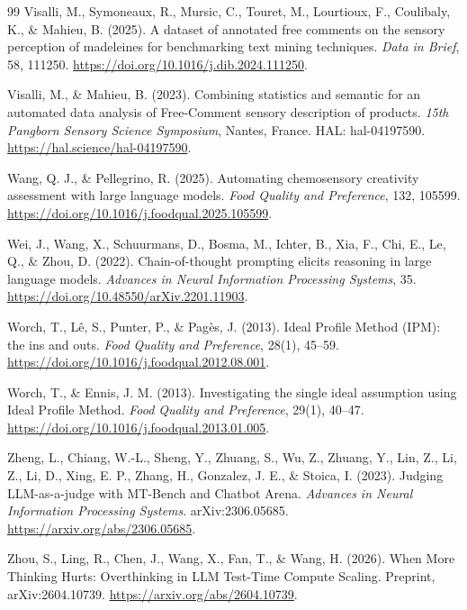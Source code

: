 \documentclass[12pt]{article}
\begin{document}
\begin{thebibliography}{99}
Visalli, M., Symoneaux, R., Mursic, C., Touret, M., Lourtioux, F., Coulibaly, K., \& Mahieu, B. (2025).
A dataset of annotated free comments on the sensory perception of madeleines for benchmarking text mining techniques.
\textit{Data in Brief}, 58, 111250.
\url{https://doi.org/10.1016/j.dib.2024.111250}.

Visalli, M., \& Mahieu, B. (2023).
Combining statistics and semantic for an automated data analysis of Free-Comment sensory description of products.
\textit{15th Pangborn Sensory Science Symposium}, Nantes, France.
HAL: hal-04197590.
\url{https://hal.science/hal-04197590}.

Wang, Q. J., \& Pellegrino, R. (2025).
Automating chemosensory creativity assessment with large language models.
\textit{Food Quality and Preference}, 132, 105599.
\url{https://doi.org/10.1016/j.foodqual.2025.105599}.

Wei, J., Wang, X., Schuurmans, D., Bosma, M., Ichter, B., Xia, F., Chi, E., Le, Q., \& Zhou, D. (2022).
Chain-of-thought prompting elicits reasoning in large language models.
\textit{Advances in Neural Information Processing Systems}, 35.
\url{https://doi.org/10.48550/arXiv.2201.11903}.

Worch, T., L{\^e}, S., Punter, P., \& Pag{\`e}s, J. (2013).
Ideal Profile Method (IPM): the ins and outs.
\textit{Food Quality and Preference}, 28(1), 45--59.
\url{https://doi.org/10.1016/j.foodqual.2012.08.001}.

Worch, T., \& Ennis, J. M. (2013).
Investigating the single ideal assumption using Ideal Profile Method.
\textit{Food Quality and Preference}, 29(1), 40--47.
\url{https://doi.org/10.1016/j.foodqual.2013.01.005}.

Zheng, L., Chiang, W.-L., Sheng, Y., Zhuang, S., Wu, Z., Zhuang, Y., Lin, Z., Li, Z., Li, D., Xing, E. P., Zhang, H., Gonzalez, J. E., \& Stoica, I. (2023).
Judging LLM-as-a-judge with MT-Bench and Chatbot Arena.
\textit{Advances in Neural Information Processing Systems}.
arXiv:2306.05685.
\url{https://arxiv.org/abs/2306.05685}.

Zhou, S., Ling, R., Chen, J., Wang, X., Fan, T., \& Wang, H. (2026).
When More Thinking Hurts: Overthinking in LLM Test-Time Compute Scaling.
Preprint, arXiv:2604.10739.
\url{https://arxiv.org/abs/2604.10739}.

\end{thebibliography}
\end{document}
